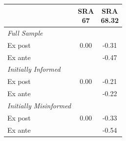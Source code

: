 \begin{tabular}{lcc}
\toprule
    & \makecell{SRA \\ 67} & \makecell{SRA \\ 68.32} \\
\midrule
\textit{Full Sample} & & \\
    Ex post & 0.00 & -0.31 \\
    Ex ante & & -0.47 \\
\midrule
\textit{Initially Informed} & & \\
    Ex post & 0.00 & -0.21 \\
    Ex ante & & -0.22 \\
\midrule
\textit{Initially Misinformed} & & \\
    Ex post & 0.00 & -0.33 \\
    Ex ante & & -0.54 \\
\bottomrule
\end{tabular}
